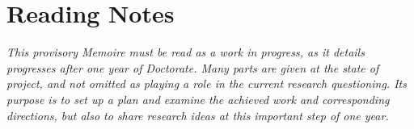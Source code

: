 



\begingroup
\let\clearpage\relax
\let\cleardoublepage\relax
\let\cleardoublepage\relax

\chapter*{Reading Notes}

\textit{This provisory Memoire must be read as a work in progress, as it details progresses after one year of Doctorate. Many parts are given at the state of project, and not omitted as playing a role in the current research questioning. Its purpose is to set up a plan and examine the achieved work and corresponding directions, but also to share research ideas at this important step of one year.}




\endgroup			

\vfill



